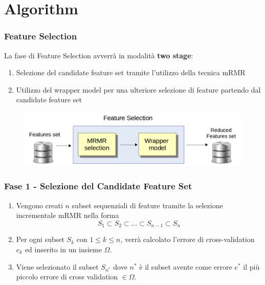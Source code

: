 \documentclass{beamer}
\begin{document}
\section{Algorithm}
\begin{frame}
	\frametitle{Feature Selection}
	La fase di Feature Selection avverrà in modalità \textbf{two stage}:
	\begin{enumerate}
		\item Selezione del candidate feature set tramite l'utilizzo della tecnica mRMR
		\item Utilizzo del wrapper model per una ulteriore selezione di feature partendo dal candidate feature set
	\end{enumerate}
	\begin{figure}[htb]
		\includegraphics[width=.9\textwidth]{figure/twostage.png}
	\end{figure}
\end{frame}
\begin{frame}
	\frametitle{Fase 1 - Selezione del Candidate Feature Set}
	\begin{enumerate}
		\item Vengono creati $n$ subset sequenziali di feature tramite la selezione incrementale mRMR nella forma
		$$S_1 \subset S_2 \subset \dots \subset S_{n-1} \subset S_n $$
		\item Per ogni subset $S_k$ con $1 \leq k \leq n$, verrà calcolato l'errore di cross-validation $e_k$ ed inserito in un insieme $\Omega$.
		\item Viene selezionato il subset $S_{n^*}$ dove $n^*$ è il subset avente come errore $e^*$ il più piccolo errore di cross validation $\in \Omega$.
	\end{enumerate}
\end{frame}
\end{document}
